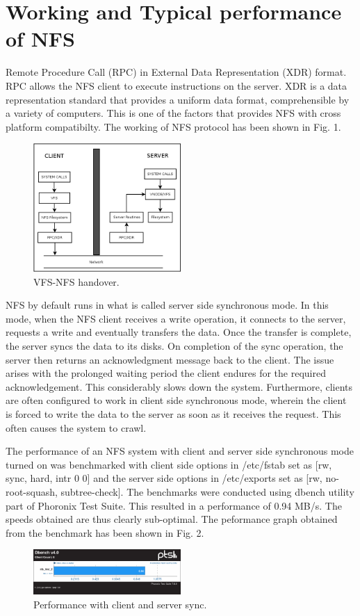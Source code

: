 \documentclass[conference]{IEEEtran}
\begin{document}
\section{Working and Typical performance of NFS}
Remote Procedure Call (RPC) in External Data Representation (XDR) format.
RPC allows the NFS client to execute instructions on the server. XDR is a
data representation standard that provides a uniform data format, comprehensible
by a variety of computers. This is one of the factors that provides NFS with
cross platform compatibilty. The working of NFS protocol has been shown in 
Fig. 1.
\begin{figure}[htbp]
\centerline{\includegraphics[width=0.5\textwidth,natwidth=400,natheight=300]{Diagram1.png}}
\caption{VFS-NFS handover.}
\label{fig}
\end{figure}
NFS by default runs in what is called server side synchronous mode. In this
mode, when the NFS client receives a write operation, it connects to the
server, requests a write and eventually transfers the data. Once the transfer is
complete, the server syncs the data to its disks. On completion of the sync
operation, the server then returns an acknowledgment message back to the client.
The issue arises with the prolonged waiting period the client endures for the
required acknowledgement. This considerably slows down the system.
Furthermore, clients are often configured to work in client side synchronous
mode, wherein the client is forced to write the data to the server as soon
as it receives the request. This often causes the system to crawl.

The performance of an NFS system with client and server side synchronous
mode turned on was benchmarked with client side options in /etc/fstab set as
[rw, sync, hard, intr 0 0] and the server side options  in /etc/exports set
as [rw, no-root-squash, subtree-check]. The benchmarks were conducted using
dbench utility part of Phoronix Test Suite. This resulted in a performance
of 0.94 MB/s. The speeds obtained are thus clearly sub-optimal. The
peformance graph obtained from the benchmark has been shown in Fig. 2.
\begin{figure}[htbp]
\centerline{\includegraphics[width=0.5\textwidth,natwidth=400,natheight=50]{nfs_working_fig_2.png}}
\caption{Performance with client and server sync.}
\label{fig}
\end{figure}
\end{document}
